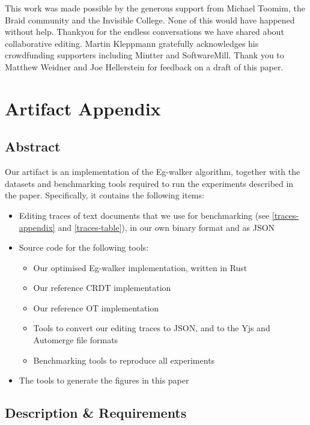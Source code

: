 \documentclass[sigplan,10pt]{acmart}
\begin{document}
\begin{acks}
  This work was made possible by the generous support from Michael Toomim, the Braid community and the Invisible College. None of this would have happened without help. Thankyou for the endless conversations we have shared about collaborative editing.
  Martin Kleppmann gratefully acknowledges his crowdfunding supporters including Mintter and SoftwareMill.
  Thank you to Matthew Weidner and Joe Hellerstein for feedback on a draft of this paper.
\end{acks}




\newpage
\appendix
\section{Artifact Appendix} 
\subsection{Abstract}

Our artifact is an implementation of the Eg-walker algorithm, together with the datasets and benchmarking tools required to run the experiments described in the paper.
Specifically, it contains the following items:
\begin{itemize}
    \item Editing traces of text documents that we use for benchmarking (see \autoref{traces-appendix} and \autoref{traces-table}), in our own binary format and as JSON
    \item Source code for the following tools:
        \begin{itemize}
            \item Our optimised Eg-walker implementation, written in Rust
            \item Our reference CRDT implementation
            \item Our reference OT implementation
            \item Tools to convert our editing traces to JSON, and to the Yjs and Automerge file formats
            \item Benchmarking tools to reproduce all experiments
        \end{itemize}
    \item The tools to generate the figures in this paper
\end{itemize}

\subsection{Description \& Requirements}
\end{document}
